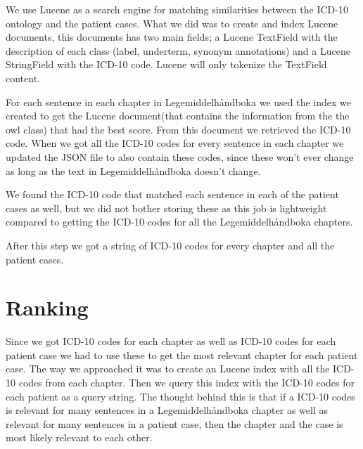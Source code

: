 We use Lucene as a search engine for matching similarities between the ICD-10
ontology and the patient cases. What we did was to create and index Lucene
documents, this documents has two main fields; a Lucene TextField with the
description of each class (label, underterm, synonym annotations) and a Lucene
StringField with the ICD-10 code. Lucene will only tokenize the TextField
content.

For each sentence in each chapter in Legemiddelhåndboka we used the index we
created to get the Lucene document(that contains the information from the the
owl class) that had the best score. From this document we retrieved the ICD-10
code. When we got all the ICD-10 codes for every sentence in each chapter we
updated the JSON file to also contain these codes, since these won’t ever change
as long as the text in Legemiddelhåndboka doesn’t change.

We found the ICD-10 code that matched each sentence in each of the patient cases
as well, but we did not bother storing these as this job is lightweight compared
to getting the ICD-10 codes for all the Legemiddelhåndboka chapters.

After this step we got a string of ICD-10 codes for every chapter and all the
patient cases.


\section{Ranking}
\label{sec:ranking}

Since we got ICD-10 codes for each chapter as well as ICD-10 codes for each
patient case we had to use these to get the most relevant chapter for each
patient case. The way we approached it was to create an Lucene index with all
the ICD-10 codes from each chapter. Then we query this index with the ICD-10
codes for each patient as a query string. The thought behind this is that if a
ICD-10 codes is relevant for many sentences in a Legemiddelhåndboka chapter as
well as relevant for many sentences in a patient case, then the chapter and the
case is most likely relevant to each other.


